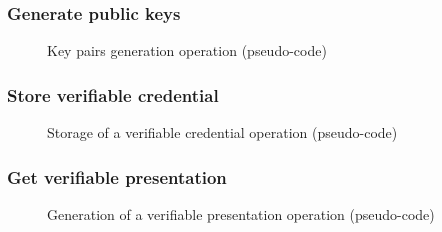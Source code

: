 \subsubsection{Generate public keys}
\begin{figure}[!h]
    \centering
    
    \caption{Key pairs generation operation (pseudo-code)}
    \label{poc-gen-keys}
\end{figure}
\subsubsection{Store verifiable credential}
\begin{figure}[!h]
    \centering
    
    \caption{Storage of a verifiable credential operation (pseudo-code)}
    \label{poc-store-vc}
\end{figure}
\subsubsection{Get verifiable presentation}
\begin{figure}[!h]
    \centering
    
    \caption{Generation of a verifiable presentation operation (pseudo-code)}
    \label{poc-get-vp}
\end{figure}


